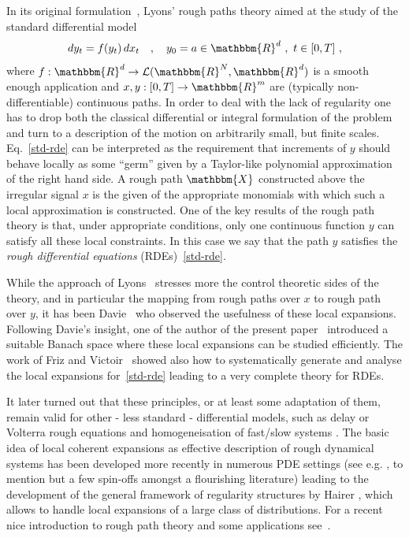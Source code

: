 \documentclass[11pt,reqno,oneside]{amsart}
\numberwithin{equation}{section}
\begin{document}
In its original formulation~\cite{MR1654527}, Lyons' rough paths theory aimed at the study of the standard differential model 
\begin{equation}\label{std-rde}
dy_t=f(y_t) \, dx_t \quad , \quad y_0=a\in \mathbbm{R}^d \ , \ t\in [0,T] \ ,
\end{equation} 
where  $f:\mathbbm{R}^d \to \mathcal{L}(\mathbbm{R}^N,\mathbbm{R}^d)$ is a smooth enough application and $x,y:[0,T]\to \mathbbm{R}^m$ are (typically non-differentiable) continuous paths. In order to deal with the lack of regularity one has to drop both the classical differential or integral formulation of the problem and turn to a description of the motion on arbitrarily small, but finite scales. Eq.~\eqref{std-rde} can be interpreted as the requirement that increments of $y$ should behave locally as some ``germ'' given by a Taylor-like polynomial approximation of the right hand side.  A rough path  $\mathbbm{X}$ constructed above the irregular signal  $x$ is the given of the appropriate monomials with which such a local approximation is constructed. One of the key results of the rough path theory is that, under appropriate conditions, only one continuous function $y$ can satisfy all these local constraints. In this case we say that  the path $y$ satisfies the \emph{rough differential equations} (RDEs)~\eqref{std-rde}. 


\smallskip

While the  approach of Lyons~\cite{MR1654527, lyons-book, MR2314753} stresses more the control theoretic sides of the theory, and in particular the mapping from rough paths over $x$ to rough path over $y$, it has been Davie~\cite{davie} who observed the usefulness of these local expansions. Following Davie's insight, one of the author of the present paper~\cite{controlling-rp} introduced a suitable Banach space where these local expansions can be studied efficiently. The work of Friz and Victoir~\cite{FV} showed also how to systematically generate and analyse the local expansions for~\eqref{std-rde} leading to a very complete theory for RDEs. 

It later turned out that these principles, or at least some adaptation of them, remain valid for other - less standard - differential models, such as delay \cite{rough-delay} or Volterra \cite{rough-volterra} rough equations and homogeneisation of fast/slow systems \cite{kelly}. The basic idea of local coherent expansions as effective description of rough dynamical systems has been developed more recently in numerous PDE settings (see e.g. \cite{paraprod,hairer-rough-pdes,MR3071506}, to mention but a few spin-offs amongst a flourishing literature) leading to the development of the general framework of regularity structures by Hairer \cite{regu-stru}, which allows to handle local expansions of a large class of distributions.  For a recent nice introduction to rough path theory and some applications see~\cite{friz_course_2014}.
\end{document}
